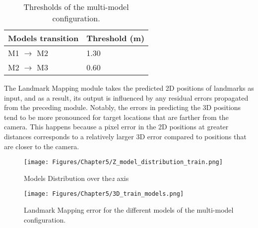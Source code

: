 \begin{table}[H]
\label{tab:Landmark Mapping Thresholds}
\centering
\begin{tabular}{l|l}
\toprule
Models transition & Threshold (m)\\
\midrule
M1 $\rightarrow$ M2 & 1.30\\
M2 $\rightarrow$ M3 & 0.60 \\
\bottomrule
\end{tabular}
\caption{Thresholds of the multi-model configuration.}
\end{table}
The Landmark Mapping module takes the predicted 2D positions of landmarks as input, and as a result, its output is influenced by any residual errors propagated from the preceding module. Notably, the errors in predicting the 3D positions tend to be more pronounced for target locations that are farther from the camera. This happens because a pixel error in the 2D positions at greater distances corresponds to a relatively larger 3D error compared to positions that are closer to the camera.


\newpage
\begin{figure}[H]
    \centering
    \texttt{[image: Figures/Chapter5/Z\_model\_distribution\_train.png]}
    \caption[Models Distribution]{Models Distribution over the\textit{z} axis}
    \label{fig:Models Distribution}
\end{figure}

\begin{figure}[H]
    \centering
    \texttt{[image: Figures/Chapter5/3D\_train\_models.png]}
    \caption[Landmark Mapping error train models]{Landmark Mapping error for the different models of the multi-model configuration.}
    \label{fig:3D train models}
\end{figure}
\newpage

